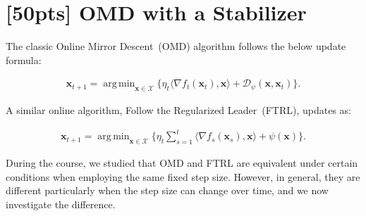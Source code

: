 \documentclass[a4paper]{article}
\numberwithin{equation}{section}
\theoremstyle{definition}
\newcommand\inner[2]{\langle #1, #2 \rangle}
\DeclareMathOperator*{\argmin}{arg\,min}
\theoremstyle{definition}
\def \D {\mathcal{D}}
\def \X {\mathcal{X}}
\def \x {\textbf{x}}
\begin{document}
\section{[50pts] OMD with a Stabilizer}
\label{sec:OMD-UBD}
The classic Online Mirror Descent~(OMD) algorithm follows the below update formula:
\begin{tcolorbox}[top=-7pt, bottom=1pt]
  \begin{align}
    \label{eq:stabilizer-omd}
    \x_{t+1} = \argmin_{\x \in \X} \big\{\eta_t \inner{\nabla f_t(\x_t)}{\x} + \D_{\psi}(\x, \x_{t}) \big\}.
  \end{align}
\end{tcolorbox}
A similar online algorithm, Follow the Regularized Leader~(FTRL), updates as:
\begin{tcolorbox}[top=-7pt, bottom=1pt]
\begin{align}
  \label{eq:stabilizer-ftrl}
  \x_{t+1} = \argmin_{\x \in \X} \Big\{\eta_t \sum_{s=1}^{t} \inner{\nabla f_s(\x_s)}{\x}+ \psi(\x) \Big\}.
\end{align}
\end{tcolorbox}
During the course, we studied that OMD and FTRL are equivalent under certain conditions when employing the same fixed step size. However, in general, they are different particularly when the step size can change over time, and we now investigate the difference.
\end{document}
